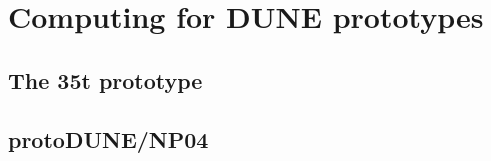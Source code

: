 \section{Computing for DUNE prototypes}
\label{sec:dune-prototypes}
\subsection{The 35t prototype}

\newpage
\subsection{protoDUNE/NP04}

\newpage


